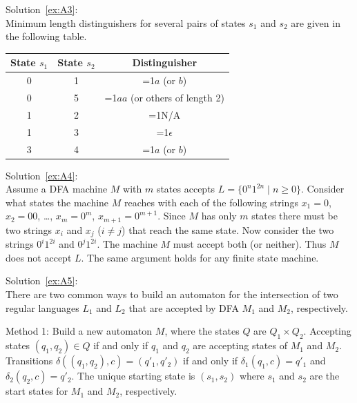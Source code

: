 \medskip
\noindent Solution~\ref{ex:A3}:\\
Minimum length distinguishers for several pairs of states $s_1$ and $s_2$ 
are given in the following table.\\
\def\inclans{1}
\begin{minipage}{\textwidth}
\setlength\tabcolsep{16pt}
\setlength\arrayrulewidth{.5pt}
        \begin{tabular}{|c|c|c|}
        \hline
        State $s_1$ & State $s_2$ & \hspace*{2cm} Distinguisher
\hspace*{2cm}  \\   \hline
        0 & 1 & \ifnum\inclans=1{$a$} (or $b$)\fi \\
        \hline
        0 & 5 & \ifnum\inclans=1{$aa$} (or others of length 2)\fi \\
        \hline
        1 & 2 & \ifnum\inclans=1{N/A}\fi \\
        \hline
        1 & 3 & \ifnum\inclans=1{$\epsilon$}\fi \\
        \hline
        3 & 4 & \ifnum\inclans=1{$a$} (or $b$)\fi \\
        \hline
        \end{tabular}
\end{minipage}

\medskip
\noindent Solution~\ref{ex:A4}:\\
Assume a DFA machine $M$ with $m$ states accepts $L=\{0^n1^{2n}
\mid n \geq 0\}$.  Consider what states the machine $M$ reaches with
each of the following strings $x_1=0$, $x_2=00$, \ldots, $x_m=0^m$,
$x_{m+1}=0^{m+1}$.  Since $M$ has only $m$ states there must be
two strings $x_i$ and $x_j$ ($i\not=j$) that reach the same state.
Now consider the two strings $0^i1^{2i}$ and $0^j1^{2i}$.  The machine
$M$ must accept both (or neither).  Thus $M$ does not accept $L$.
The same argument holds for any finite state machine.


\medskip
\noindent Solution~\ref{ex:A5}:\\
There are two common ways to build an automaton for the
intersection of
two regular languages $L_1$ and $L_2$ that are accepted by DFA $M_1$ and
$M_2$, respectively.

Method 1: Build a new automaton $M$, where the states $Q$ are $Q_1
\times Q_2$.  Accepting states $(q_1,q_2) \in Q$ if and only if
$q_1$ and $q_2$ are accepting states of $M_1$ and $M_2$. Transitions
$\delta((q_1,q_2),c)=(q'_1,q'_2)$ if and only if $\delta_1(q_1,c)=q'_1$
and $\delta_2(q_2,c)=q'_2$. The unique starting state is $(s_1,s_2)$
where $s_1$ and $s_2$ are the start states for $M_1$ and $M_2$,
respectively.

